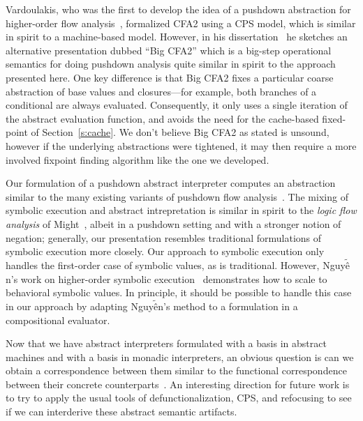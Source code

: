 Vardoulakis, who was the first to develop the idea of a pushdown abstraction
for higher-order flow analysis~\cite{dvanhorn:Vardoulakis2011CFA2}, formalized
CFA2 using a CPS model, which is similar in spirit to a machine-based model.
However, in his dissertation~\cite{local:vardoulakis-diss12} he sketches an
alternative presentation dubbed ``Big CFA2'' which is a big-step operational
semantics for doing pushdown analysis quite similar in spirit to the approach
presented here.  One key difference is that Big CFA2 fixes a particular coarse
abstraction of base values and closures---for example, both branches of a
conditional are always evaluated.  Consequently, it only uses a single
iteration of the abstract evaluation function, and avoids the need for the
cache-based fixed-point of Section~\ref{s:cache}.  We don't believe Big CFA2 as
stated is unsound, however if the underlying abstractions were tightened, it
may then require a more involved fixpoint finding algorithm like the one we
developed.

Our formulation of a pushdown abstract interpreter computes an abstraction
similar to the many existing variants of pushdown flow analysis~\cite%
{dvanhorn:Vardoulakis2011CFA2%
,dvanhorn:Earl2010Pushdown%
,local:vardoulakis-diss12%
,dvanhorn:VanHorn2012Systematic%
,dvanhorn:Earl2012Introspective%
,dvanhorn:Johnson2014Abstracting%
,dvanhorn:Johnson2014Pushdown%
,local:p4f%
}.
The mixing of symbolic execution and abstract intrepretation is similar in
spirit to the \emph{logic flow analysis} of Might~\cite{local:might-popl07},
albeit in a pushdown setting and with a stronger notion of negation; generally,
our presentation resembles traditional formulations of symbolic execution more
closely.  Our approach to symbolic execution only handles the first-order case
of symbolic values, as is traditional.  However, Nguy$\tilde{\mbox{\^{e}}}$n's work on higher-order %
symbolic execution~\cite{dvanhorn:Nguyen2015Relatively} demonstrates how to
scale to behavioral symbolic values.  In principle, it should be possible to
handle this case in our approach by adapting Nguy$\tilde{\mbox{\^{e}}}$n's method to a formulation %
in a compositional evaluator.

Now that we have abstract interpreters formulated with a basis in abstract
machines and with a basis in monadic interpreters, an obvious question is can
we obtain a correspondence between them similar to the functional
correspondence between their concrete
counterparts~\cite{dvanhorn:Ager2005Functional}.  An interesting direction for
future work is to try to apply the usual tools of defunctionalization, CPS, and
refocusing to see if we can interderive these abstract semantic artifacts.
